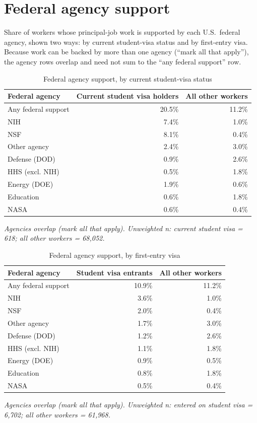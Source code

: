 \documentclass[11pt]{article}
\begin{document}
\section{Federal agency support}
Share of workers whose principal-job work is supported by each U.S.\ federal agency, shown two ways: by current student-visa status and by first-entry visa. Because work can be backed by more than one agency (``mark all that apply''), the agency rows overlap and need not sum to the ``any federal support'' row.
\begin{table}[H]
\centering
\caption{Federal agency support, by current student-visa status}

\begin{tabular}{lrr}
\toprule
Federal agency & Current student visa holders & All other workers\\
\midrule
Any federal support & 20.5\% & 11.2\%\\
NIH & 7.4\% & 1.0\%\\
NSF & 8.1\% & 0.4\%\\
Other agency & 2.4\% & 3.0\%\\
Defense (DOD) & 0.9\% & 2.6\%\\
HHS (excl. NIH) & 0.5\% & 1.8\%\\
Energy (DOE) & 1.9\% & 0.6\%\\
Education & 0.6\% & 1.8\%\\
NASA & 0.6\% & 0.4\%\\
\bottomrule
\end{tabular}
\vspace{3pt}
{\footnotesize\itshape Agencies overlap (mark all that apply). Unweighted n: current student visa = 618; all other workers = 68,052.}
\end{table}
\begin{table}[H]
\centering
\caption{Federal agency support, by first-entry visa}

\begin{tabular}{lrr}
\toprule
Federal agency & Student visa entrants & All other workers\\
\midrule
Any federal support & 10.9\% & 11.2\%\\
NIH & 3.6\% & 1.0\%\\
NSF & 2.0\% & 0.4\%\\
Other agency & 1.7\% & 3.0\%\\
Defense (DOD) & 1.2\% & 2.6\%\\
HHS (excl. NIH) & 1.1\% & 1.8\%\\
Energy (DOE) & 0.9\% & 0.5\%\\
Education & 0.8\% & 1.8\%\\
NASA & 0.5\% & 0.4\%\\
\bottomrule
\end{tabular}
\vspace{3pt}
{\footnotesize\itshape Agencies overlap (mark all that apply). Unweighted n: entered on student visa = 6,702; all other workers = 61,968.}
\end{table}
\end{document}
